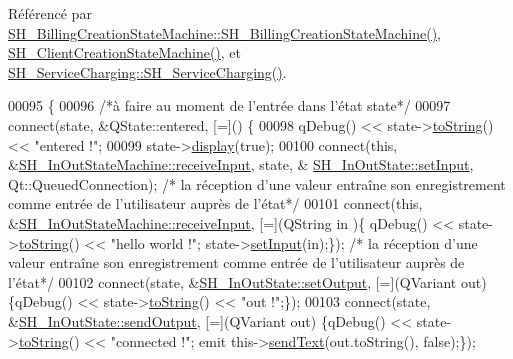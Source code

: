 Référencé par \hyperlink{classSH__BillingCreationStateMachine_ad62b77fa4aeafe200056ff3974562f83}{S\-H\-\_\-\-Billing\-Creation\-State\-Machine\-::\-S\-H\-\_\-\-Billing\-Creation\-State\-Machine()}, \hyperlink{classSH__ClientCreationStateMachine_a0b406b0f404c0fd33bf35be8ce0cc811}{S\-H\-\_\-\-Client\-Creation\-State\-Machine()}, et \hyperlink{classSH__ServiceCharging_afa5273d046049b1c2b020a6a19a8290b}{S\-H\-\_\-\-Service\-Charging\-::\-S\-H\-\_\-\-Service\-Charging()}.


\begin{DoxyCode}
00095 \{
00096     \textcolor{comment}{/*à faire au moment de l'entrée dans l'état state*/}
00097     connect(state, &QState::entered, [=]() \{
00098         qDebug() << state->\hyperlink{classSH__GenericState_a7779babbb40f3f8faa71112204d9804f}{toString}() << \textcolor{stringliteral}{"entered !"};
00099         state->\hyperlink{classSH__InOutState_a616f88b20478b81b2927a9ddc2b4f521}{display}(\textcolor{keyword}{true});
00100         connect(\textcolor{keyword}{this}, &\hyperlink{classSH__InOutStateMachine_a037ed5e13ecfae2123a8d4940292e410}{SH\_InOutStateMachine::receiveInput}, state, &
      \hyperlink{classSH__InOutState_aaec9c2b5ef7c406bff7469461352d47c}{SH\_InOutState::setInput}, Qt::QueuedConnection); \textcolor{comment}{/* la réception d'une valeur
       entraîne son enregistrement comme entrée de l'utilisateur auprès de l'état*/}
00101         connect(\textcolor{keyword}{this}, &\hyperlink{classSH__InOutStateMachine_a037ed5e13ecfae2123a8d4940292e410}{SH\_InOutStateMachine::receiveInput}, [=](QString in
      )\{ qDebug() << state->\hyperlink{classSH__GenericState_a7779babbb40f3f8faa71112204d9804f}{toString}() << \textcolor{stringliteral}{"hello world !"}; state->\hyperlink{classSH__InOutState_aaec9c2b5ef7c406bff7469461352d47c}{setInput}(in);\}); \textcolor{comment}{/* la réception
       d'une valeur entraîne son enregistrement comme entrée de l'utilisateur auprès de l'état*/}
00102         connect(state, &\hyperlink{classSH__InOutState_af611c84134e262739cd834797b315c80}{SH\_InOutState::setOutput}, [=](QVariant out) \{qDebug() << 
      state->\hyperlink{classSH__GenericState_a7779babbb40f3f8faa71112204d9804f}{toString}() << \textcolor{stringliteral}{"out !"};\});
00103         connect(state, &\hyperlink{classSH__InOutState_a77921c5f42059bc97361f4ff7827da12}{SH\_InOutState::sendOutput}, [=](QVariant out) \{qDebug() << 
      state->\hyperlink{classSH__GenericState_a7779babbb40f3f8faa71112204d9804f}{toString}() << \textcolor{stringliteral}{"connected !"}; emit this->\hyperlink{classSH__InOutStateMachine_a5e7f5958bae31696b6a8deab94ad2b4f}{sendText}(out.toString(), \textcolor{keyword}{false});\});

\end{DoxyCode}
